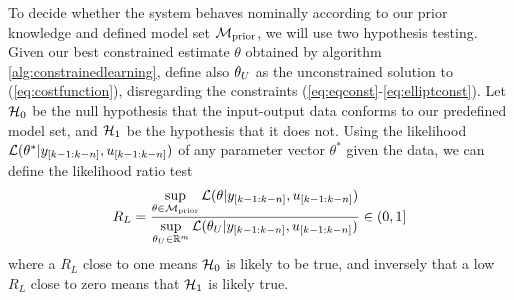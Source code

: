 
To decide whether the system behaves nominally according to our prior knowledge and
defined model set $\mathcal{M}_{\text{prior}}$, we will use two hypothesis testing.
Given our best constrained estimate $\theta$ obtained by algorithm \ref{alg:constrainedlearning},
define also $\theta_{U}$ as the unconstrained solution to (\ref{eq:costfunction}), disregarding
the constraints (\ref{eq:eqconst}-\ref{eq:elliptconst}).
Let $\mathcal{H}_0$ be the null hypothesis that the input-output data conforms to our predefined model set,
and $\mathcal{H}_1$ be the hypothesis that it does not.
Using the likelihood $\mathcal{L}(\theta^* \vert y_{[k-1:k-n]}, u_{[k-1:k-n]})$
of any parameter vector $\theta^*$ given the data, we can define the
likelihood ratio test
\begin{equation}
    R_L = \frac{\sup\limits_{\theta \in \mathcal{M}_{\text{prior}}}
    \mathcal{L}(\theta \vert y_{[k-1:k-n]}, u_{[k-1:k-n]})}
    {\sup\limits_{\theta_{U} \in \mathbb{R}^m}
    \mathcal{L}(\theta_{U} \vert y_{[k-1:k-n]}, u_{[k-1:k-n]})} \in (0,1]
\end{equation}
where a $R_L$ close to one means  $\mathcal{H}_0$ is likely to be true, and
inversely that a low $R_L$ close to zero means that $\mathcal{H}_1$ is likely true.